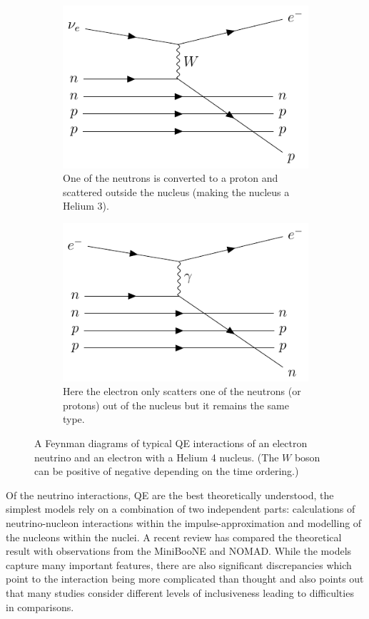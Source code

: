 \documentclass[a4paper,12pt]{article}
\begin{document}
\begin{figure}[H]
\centering
    \begin{subfigure}[b]{0.45\textwidth}
        \centering
        \includegraphics{figures/fds/QEFDneu.pdf}
        \caption{
            One of the neutrons is converted to a proton and scattered outside the nucleus (making the nucleus a Helium 3).
        }
    \end{subfigure}
    \hspace{1em}
    \begin{subfigure}[b]{0.45\textwidth}
        \centering
        \includegraphics{figures/fds/QEFDel.pdf}
        \caption{
            Here the electron only scatters one of the neutrons (or protons) out of the nucleus but it remains the same type.
        }
    \end{subfigure}
    \caption{
        A Feynman diagrams of typical QE interactions of an electron neutrino and an electron with a Helium 4 nucleus.
        (The $W$ boson can be positive of negative depending on the time ordering.)
    }\label{fig:QE_fd}
\end{figure}

Of the neutrino interactions, QE are the best theoretically understood, the simplest models rely on a combination of two independent parts: calculations of neutrino-nucleon interactions within the impulse-approximation and modelling of the nucleons within the nuclei.
A recent review \cite{gallagherNeutrinoNucleusInteractions2011} has compared the theoretical result with observations from the MiniBooNE and NOMAD.
While the models capture many important features, there are also significant discrepancies which point to the interaction being more complicated than thought and also points out that many studies consider different levels of inclusiveness leading to difficulties in comparisons.
\end{document}
